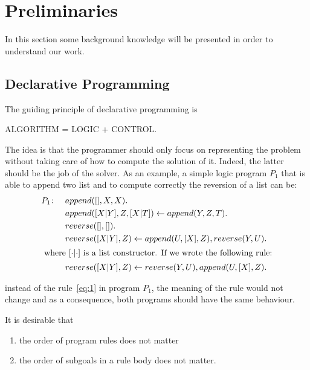 \section{Preliminaries}
\label{sec:prelim}

In this section some background knowledge will be presented in order to understand our work. 


\subsection{Declarative Programming}
The guiding principle of declarative programming is
\begin{center} 
  ALGORITHM = LOGIC + CONTROL.
\end{center}
The idea is that the programmer should only focus on representing the problem without taking care of how to compute the solution of it. Indeed, the latter should be the job of the solver. As an example, a simple logic program \(P_1\) that  is able to append two list and to compute correctly the reversion of a list can be: 
\begin{align}
P_1 \colon \quad%
&append ([], X, X). \\
&append ([X|Y], Z, [X|T ]) \leftarrow append (Y, Z, T ). \\
&reverse([ ], [ ]).\\
&reverse([X|Y ], Z) \leftarrow append (U, [X], Z), reverse(Y, U ). \label{eq:1} \\
\intertext{
where \([\cdot|\cdot]\) is a list constructor.
If we wrote the following rule:}
&reverse([X|Y ], Z) \leftarrow reverse(Y, U ), append(U, [X], Z). \label{eq:2}
\end{align}

instead of the rule~\eqref{eq:1} in program \(P_1\), the meaning of the rule would not change and as a consequence, both programs should have the same behaviour. 

It is desirable that
\begin{enumerate}
\item the order of program rules does not matter
\item the order of subgoals in a rule body does not matter.
\end{enumerate}

